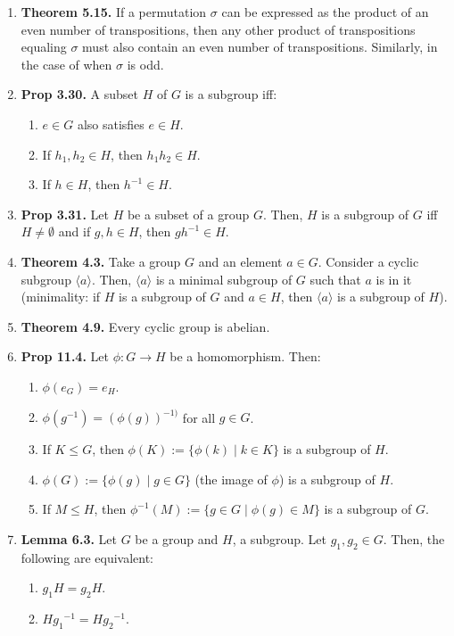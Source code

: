 \documentclass[12pt]{article}
\theoremstyle{definition}
\theoremstyle{named}
\begin{document}
\begin{enumerate}
	\item \textbf{Theorem 5.15. } If a permutation $\sigma$ can be expressed as the product of an even number of transpositions, then any other product of transpositions equaling $\sigma$ must also contain an even number of transpositions. Similarly, in the case of when $\sigma$ is odd. 
	\item \textbf{Prop 3.30. } A subset $H$ of $G$ is a subgroup iff: 
	\begin{enumerate}
		\item $e \in G$ also satisfies $e \in H$. 
		\item If $h_1,h_2 \in H$, then $h_1h_2 \in H$. 
		\item If $h \in H$, then $h^{-1} \in H$. 
	\end{enumerate}
	\item \textbf{Prop 3.31. } Let $H$ be a subset of a group $G$. Then, $H$ is a subgroup of $G$ iff $H \neq \emptyset$ and if $g,h \in H$, then $gh^{-1} \in H$. 
	\item \textbf{Theorem 4.3. } Take a group $G$ and an element $a \in G$. Consider a cyclic subgroup $\langle a \rangle$. Then, $\langle a \rangle$ is a minimal subgroup of $G$ such that $a$ is in it (minimality: if $H$ is a subgroup of $G$ and $a \in H$, then $\langle a \rangle$ is a subgroup of $H$). 
	\item \textbf{Theorem 4.9. } Every cyclic group is abelian. 
	\item \textbf{Prop 11.4. } Let $\phi: G \to H$ be a homomorphism. Then: 
	\begin{enumerate}
		\item $\phi(e_G) = e_H$. 
		\item $\phi(g^{-1}) = (\phi(g))^{-1)}$ for all $g \in G$. 
		\item If $K \leq G$, then $\phi(K) := \{\phi(k) \mid k \in K\}$ is a subgroup of $H$. 
		\item $\phi(G) := \{\phi(g) \mid g \in G\}$ (the image of $\phi$) is a subgroup of $H$. 
		\item If $M \leq H$, then $\phi^{-1}(M) := \{g \in G \mid \phi(g) \in M\}$ is a subgroup of $G$. 
	\end{enumerate}
	\item \textbf{Lemma 6.3. } Let $G$ be a group and $H$, a subgroup. Let $g_1,g_2 \in G$. Then, the following are equivalent: 
	\begin{enumerate}
		\item $g_1H = g_2H$. 
		\item $H{g_1}^{-1} = H{g_2}^{-1}$. 

\end{enumerate}
\end{enumerate}
\end{document}
